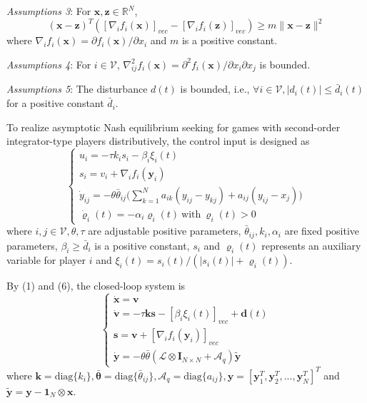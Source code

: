 \documentclass[12pt, a4paper, oneside]{ctexbook}
\begin{document}
\emph{Assumptions 3}: For $\mathbf{x}, \mathbf{z} \in \mathbb{R}^N$,
\begin{equation}
    (\mathbf{x}-\mathbf{z})^T([\nabla_if_i(\mathbf{x})]_{vec}-[\nabla_if_i(\mathbf{z})]_{vec})\geq m\|\mathbf{x}-\mathbf{z}\|^2
\end{equation}
where $\nabla_{i}f_{i}(\mathbf{x})=\partial f_{i}(\mathbf{x})/\partial x_{i}$ and $m$ is a positive constant.

\emph{Assumptions 4}: For $i \in \mathcal{V}$, $\nabla_{ij}^{2}f_{i}(\mathbf{x})=\partial^{2}f_{i}(\mathbf{x})/\partial x_{i}\partial x_{j}$ is bounded.

\emph{Assumptions 5}: The disturbance $d(t)$ is bounded, i.e., $\forall i \in \mathcal{V}, |d_i(t)|\leq \bar{d}_i(t)$ for a positive constant $\bar{d}_i$.

To realize asymptotic Nash equilibrium seeking for games with second-order integrator-type players distributively, the control input is designed as
\begin{equation}
    \begin{cases}
    u_i=-\tau k_is_i-\beta_i\xi_i(t)\\
    s_i=v_i+\nabla_if_i(\mathbf{y}_i)\\
    \dot{y}_{ij}=-\theta\bar{\theta}_{ij}\Bigg(\sum_{k=1}^Na_{ik}(y_{ij}-y_{kj})+a_{ij}(y_{ij}-x_j)\Bigg)\\
    \dot{\varrho}_i(t) = -\alpha_i \varrho_i(t)~\text{with}~\varrho_i(t) > 0 
    \end{cases}
\end{equation}
where $i,j \in \mathcal{V}, \theta, \tau$ are adjustable positive parameters, $\bar{\theta}_{ij}, k_i, \alpha_i$ are fixed positive parameters, $\beta_i \geq \bar{d}_i$ is a positive constant, $s_i$ and $\varrho_i(t)$ represents an auxiliary variable for player $i$ and $\xi_i(t) = s_i(t)/(|s_i(t)| + \varrho_i(t))$.

By (1) and (6), the closed-loop system is 
\begin{equation}
    \begin{cases}
        \dot{\mathbf{x}}=\mathbf{v}\\
        \dot{\mathbf{v}}=-\tau\mathbf{k}\mathbf{s}-[\beta_i\xi_i(t)]_{vec}+\mathbf{d}(t) \\
        \mathbf{s}=\mathbf{v}+[\nabla_if_i(\mathbf{y}_i)]_{vec}                          \\
        \dot{\mathbf{y}}=-\theta\bar{\theta}(\mathcal{L}\otimes\mathbf{I}_{N\times N}+\mathcal{A}_q)\tilde{\mathbf{y}}
    \end{cases}
\end{equation}
where $\mathbf{k} = \text{diag}\{k_i\}, 
\bar{\mathbf{\theta}} = \text{diag}\{\bar{\theta}_{ij}\}, 
\mathcal{A}_q = \text{diag}\{a_{ij}\}, \mathbf{y} = [\mathbf{y}_1^T,\mathbf{y}_2^T,...,\mathbf{y}_N^T]^T$ and $\tilde{\mathbf{y}} = \mathbf{y} - \mathbf{1}_N \otimes \mathbf{x}$.
\end{document}
